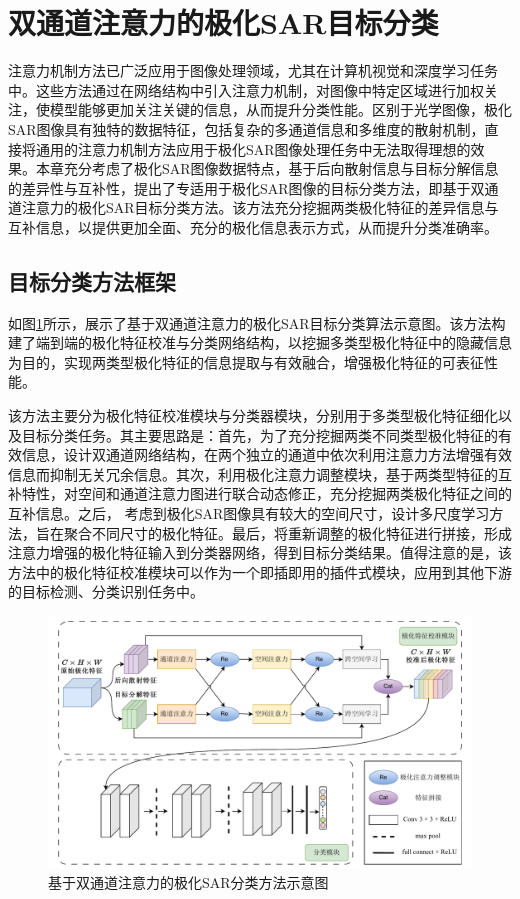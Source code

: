 \section{双通道注意力的极化SAR目标分类}
注意力机制方法已广泛应用于图像处理领域，尤其在计算机视觉和深度学习任务中。这些方法通过在网络结构中引入注意力机制，对图像中特定区域进行加权关注，使模型能够更加关注关键的信息，从而提升分类性能。区别于光学图像，极化SAR图像具有独特的数据特征，包括复杂的多通道信息和多维度的散射机制，直接将通用的注意力机制方法应用于极化SAR图像处理任务中无法取得理想的效果。本章充分考虑了极化SAR图像数据特点，基于后向散射信息与目标分解信息的差异性与互补性，提出了专适用于极化SAR图像的目标分类方法，即基于双通道注意力的极化SAR目标分类方法。该方法充分挖掘两类极化特征的差异信息与互补信息，以提供更加全面、充分的极化信息表示方式，从而提升分类准确率。

\subsection{目标分类方法框架}
如图\ref{DPEN_framework}所示，展示了基于双通道注意力的极化SAR目标分类算法示意图。该方法构建了端到端的极化特征校准与分类网络结构，以挖掘多类型极化特征中的隐藏信息为目的，实现两类型极化特征的信息提取与有效融合，增强极化特征的可表征性能。

该方法主要分为极化特征校准模块与分类器模块，分别用于多类型极化特征细化以及目标分类任务。其主要思路是：首先，为了充分挖掘两类不同类型极化特征的有效信息，设计双通道网络结构，在两个独立的通道中依次利用注意力方法增强有效信息而抑制无关冗余信息。其次，利用极化注意力调整模块，基于两类型特征的互补特性，对空间和通道注意力图进行联合动态修正，充分挖掘两类极化特征之间的互补信息。之后， 考虑到极化SAR图像具有较大的空间尺寸，设计多尺度学习方法，旨在聚合不同尺寸的极化特征。最后，将重新调整的极化特征进行拼接，形成注意力增强的极化特征输入到分类器网络，得到目标分类结果。值得注意的是，该方法中的极化特征校准模块可以作为一个即插即用的插件式模块，应用到其他下游的目标检测、分类识别任务中。

\begin{figure}[ht!]
    \centering
    \includegraphics[width=14cm]{pic/chapter3/基于双通道注意力的极化SAR分类方法.pdf}
    \caption{基于双通道注意力的极化SAR分类方法示意图}
    \label{DPEN_framework}
\end{figure}

